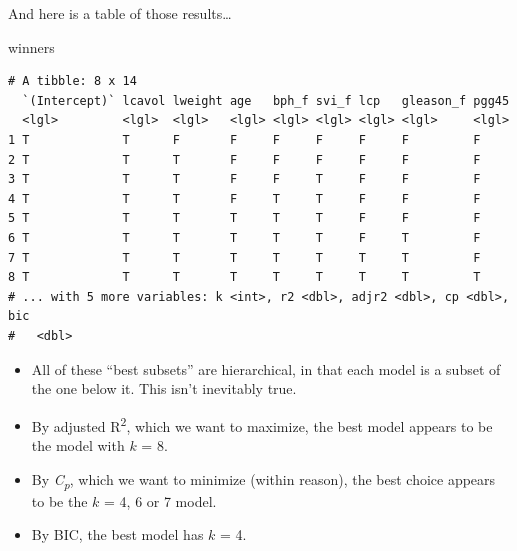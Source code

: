 \documentclass[]{book}
\newenvironment{Shaded}{\begin{snugshade}}{\end{snugshade}}
\newcommand{\KeywordTok}[1]{\textcolor[rgb]{0.13,0.29,0.53}{\textbf{#1}}}
\newcommand{\DecValTok}[1]{\textcolor[rgb]{0.00,0.00,0.81}{#1}}
\newcommand{\StringTok}[1]{\textcolor[rgb]{0.31,0.60,0.02}{#1}}
\newcommand{\OperatorTok}[1]{\textcolor[rgb]{0.81,0.36,0.00}{\textbf{#1}}}
\newcommand{\NormalTok}[1]{#1}
\providecommand{\tightlist}{%
  \setlength{\itemsep}{0pt}\setlength{\parskip}{0pt}}
\theoremstyle{definition}
\theoremstyle{definition}
\theoremstyle{definition}
\theoremstyle{remark}
\begin{document}
\begin{Shaded}
\end{Shaded}

And here is a table of those results\ldots{}

\begin{Shaded}
\begin{Highlighting}[]
\NormalTok{winners}
\end{Highlighting}
\end{Shaded}

\begin{verbatim}
# A tibble: 8 x 14
  `(Intercept)` lcavol lweight age   bph_f svi_f lcp   gleason_f pgg45
  <lgl>         <lgl>  <lgl>   <lgl> <lgl> <lgl> <lgl> <lgl>     <lgl>
1 T             T      F       F     F     F     F     F         F    
2 T             T      T       F     F     F     F     F         F    
3 T             T      T       F     F     T     F     F         F    
4 T             T      T       F     T     T     F     F         F    
5 T             T      T       T     T     T     F     F         F    
6 T             T      T       T     T     T     F     T         F    
7 T             T      T       T     T     T     T     T         F    
8 T             T      T       T     T     T     T     T         T    
# ... with 5 more variables: k <int>, r2 <dbl>, adjr2 <dbl>, cp <dbl>, bic
#   <dbl>
\end{verbatim}

\begin{itemize}
\tightlist
\item
  All of these ``best subsets'' are hierarchical, in that each model is
  a subset of the one below it. This isn't inevitably true.
\item
  By adjusted R\textsuperscript{2}, which we want to maximize, the best
  model appears to be the model with \(k\) = 8.
\item
  By \emph{C\textsubscript{p}}, which we want to minimize (within
  reason), the best choice appears to be the \(k\) = 4, 6 or 7 model.
\item
  By BIC, the best model has \(k\) = 4.
\end{itemize}
\end{document}

